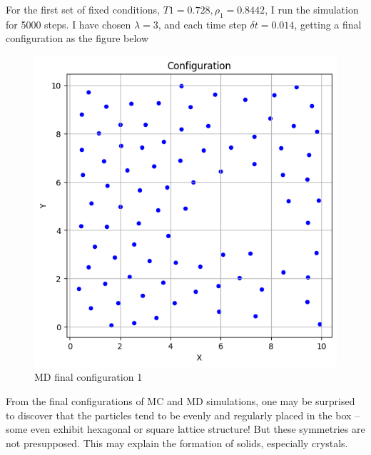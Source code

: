 \documentclass[letterpaper,12pt]{article}
\numberwithin{equation}{section}
\begin{document}
\begin{enumerate}[label=(\alph*)]
    \vspace{\baselineskip}
    For the first set of fixed conditions, $T1=0.728,\rho_1=0.8442$, I run the simulation for 5000 steps. I have chosen $\lambda=3$, and each time step $\delta t=0.014$, getting a final configuration as the figure below 
    \begin{figure}[H]
        \centering
        \includegraphics[width=.8\textwidth]{final_config_md1.png}
        \caption{MD final configuration 1} 
    \end{figure}
    From the final configurations of MC and MD simulations, one may be surprised to discover that the particles tend to be evenly and regularly placed in the box -- some even exhibit hexagonal or square lattice structure! But these symmetries are not presupposed. This may explain the formation of solids, especially crystals. 


\end{enumerate}
\end{document}
